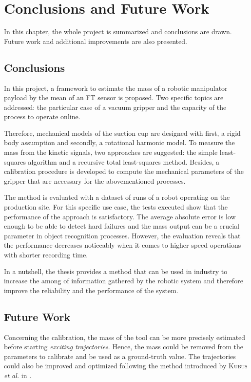 \documentclass[/home/francois/latex/report/main.tex]{subfiles}
\begin{document}
\chapter{Conclusions and Future Work}
\label{chapter:conclusions}

In this chapter, the whole project is summarized and conclusions are drawn. Future work and additional improvements are also presented.

\section{Conclusions}

In this project, a framework to estimate the mass of a robotic manipulator payload by the mean of an \ac{FT} sensor is proposed. Two specific topics are addressed: the particular case of a vacuum gripper and the capacity of the process to operate online.

Therefore, mechanical models of the suction cup are designed with first, a rigid body assumption and secondly, a rotational harmonic model. To measure the mass from the kinetic signals, two approaches are suggested: the simple least-squares algorithm and a recursive total least-squares method. Besides, a calibration procedure is developed to compute the mechanical parameters of the gripper that are necessary for the abovementioned processes.

The method is evaluated with a dataset of runs of a robot operating on the production site. For this specific use case, the tests executed show that the performance of the approach is satisfactory. The average absolute error is low enough to be able to detect hard failures and the mass output can be a crucial parameter in object recognition processes. However, the evaluation reveals that the performance decreases noticeably when it comes to higher speed operations with shorter recording time.

In a nutshell, the thesis provides a method that can be used in industry to increase the among of information gathered by the robotic system and therefore improve the reliability and the performance of the system.

\section{Future Work}

Concerning the calibration, the mass of the tool can be more precisely estimated before starting \textit{exciting trajectories}. Hence, the mass could be removed from the parameters to calibrate and be used as a ground-truth value. The trajectories could also be improved and optimized following the method introduced by \textsc{Kubus} \textit{et al.} in \cite{Kubus2008}.
\end{document}
